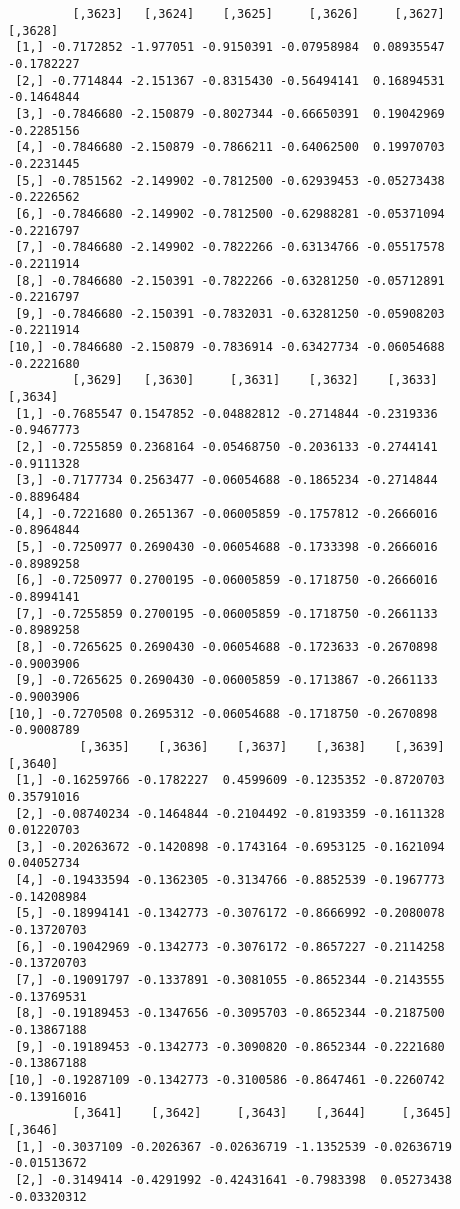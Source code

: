 \documentclass[
  letterpaper,
  DIV=11,
  numbers=noendperiod]{scrreprt}
\begin{document}
\begin{verbatim}
         [,3623]   [,3624]    [,3625]     [,3626]     [,3627]    [,3628]
 [1,] -0.7172852 -1.977051 -0.9150391 -0.07958984  0.08935547 -0.1782227
 [2,] -0.7714844 -2.151367 -0.8315430 -0.56494141  0.16894531 -0.1464844
 [3,] -0.7846680 -2.150879 -0.8027344 -0.66650391  0.19042969 -0.2285156
 [4,] -0.7846680 -2.150879 -0.7866211 -0.64062500  0.19970703 -0.2231445
 [5,] -0.7851562 -2.149902 -0.7812500 -0.62939453 -0.05273438 -0.2226562
 [6,] -0.7846680 -2.149902 -0.7812500 -0.62988281 -0.05371094 -0.2216797
 [7,] -0.7846680 -2.149902 -0.7822266 -0.63134766 -0.05517578 -0.2211914
 [8,] -0.7846680 -2.150391 -0.7822266 -0.63281250 -0.05712891 -0.2216797
 [9,] -0.7846680 -2.150391 -0.7832031 -0.63281250 -0.05908203 -0.2211914
[10,] -0.7846680 -2.150879 -0.7836914 -0.63427734 -0.06054688 -0.2221680
         [,3629]   [,3630]     [,3631]    [,3632]    [,3633]    [,3634]
 [1,] -0.7685547 0.1547852 -0.04882812 -0.2714844 -0.2319336 -0.9467773
 [2,] -0.7255859 0.2368164 -0.05468750 -0.2036133 -0.2744141 -0.9111328
 [3,] -0.7177734 0.2563477 -0.06054688 -0.1865234 -0.2714844 -0.8896484
 [4,] -0.7221680 0.2651367 -0.06005859 -0.1757812 -0.2666016 -0.8964844
 [5,] -0.7250977 0.2690430 -0.06054688 -0.1733398 -0.2666016 -0.8989258
 [6,] -0.7250977 0.2700195 -0.06005859 -0.1718750 -0.2666016 -0.8994141
 [7,] -0.7255859 0.2700195 -0.06005859 -0.1718750 -0.2661133 -0.8989258
 [8,] -0.7265625 0.2690430 -0.06054688 -0.1723633 -0.2670898 -0.9003906
 [9,] -0.7265625 0.2690430 -0.06005859 -0.1713867 -0.2661133 -0.9003906
[10,] -0.7270508 0.2695312 -0.06054688 -0.1718750 -0.2670898 -0.9008789
          [,3635]    [,3636]    [,3637]    [,3638]    [,3639]     [,3640]
 [1,] -0.16259766 -0.1782227  0.4599609 -0.1235352 -0.8720703  0.35791016
 [2,] -0.08740234 -0.1464844 -0.2104492 -0.8193359 -0.1611328  0.01220703
 [3,] -0.20263672 -0.1420898 -0.1743164 -0.6953125 -0.1621094  0.04052734
 [4,] -0.19433594 -0.1362305 -0.3134766 -0.8852539 -0.1967773 -0.14208984
 [5,] -0.18994141 -0.1342773 -0.3076172 -0.8666992 -0.2080078 -0.13720703
 [6,] -0.19042969 -0.1342773 -0.3076172 -0.8657227 -0.2114258 -0.13720703
 [7,] -0.19091797 -0.1337891 -0.3081055 -0.8652344 -0.2143555 -0.13769531
 [8,] -0.19189453 -0.1347656 -0.3095703 -0.8652344 -0.2187500 -0.13867188
 [9,] -0.19189453 -0.1342773 -0.3090820 -0.8652344 -0.2221680 -0.13867188
[10,] -0.19287109 -0.1342773 -0.3100586 -0.8647461 -0.2260742 -0.13916016
         [,3641]    [,3642]     [,3643]    [,3644]     [,3645]     [,3646]
 [1,] -0.3037109 -0.2026367 -0.02636719 -1.1352539 -0.02636719 -0.01513672
 [2,] -0.3149414 -0.4291992 -0.42431641 -0.7983398  0.05273438 -0.03320312

\end{verbatim}
\end{document}
